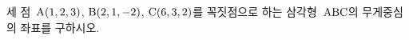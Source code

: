 세 점~$\mathrm{A}(1{,}\mkern3mu\mathopen{}2{,}\mkern3mu\mathopen{}3)$, $\mathrm{B}(2{,}\mkern3mu\mathopen{}1{,}\mkern3mu\mathopen{}-2)$, $\mathrm{C}(6{,}\mkern3mu\mathopen{}3{,}\mkern3mu\mathopen{}2)$를 꼭짓점으로 하는 삼각형~$\mathrm{ABC}$의 무게중심의 좌표를 구하시오.
